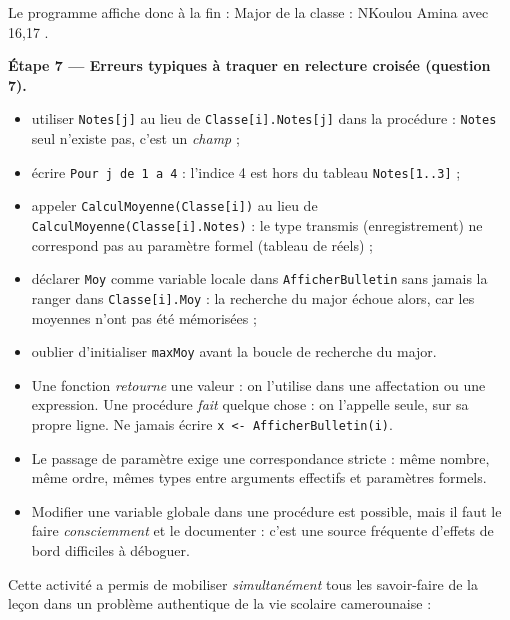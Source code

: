\documentclass[11pt]{article}
\newcounter{popsec}
\newcounter{popsub}
\newcommand{\courssub}[1]{%
  \stepcounter{popsub}%
  \par\vspace{9pt}\noindent{\popxbold\fontsize{11.5}{13}\selectfont\color{popink}{\color{poporange}\thepopsec.\thepopsub}\hspace{6pt}#1}\par\nopagebreak\vspace{4pt}
}
\begin{document}
\begin{exoresolu}
Le programme affiche donc à la fin : \og Major de la classe : NKoulou Amina avec 16,17 \fg{}.

\textbf{Étape 7 — Erreurs typiques à traquer en relecture croisée (question 7).}

\begin{itemize}
  \item utiliser \texttt{Notes[j]} au lieu de \texttt{Classe[i].Notes[j]} dans la procédure : \texttt{Notes} seul n'existe pas, c'est un \emph{champ} ;
  \item écrire \texttt{Pour j de 1 a 4} : l'indice 4 est hors du tableau \texttt{Notes[1..3]} ;
  \item appeler \texttt{CalculMoyenne(Classe[i])} au lieu de \texttt{CalculMoyenne(Classe[i].Notes)} : le type transmis (enregistrement) ne correspond pas au paramètre formel (tableau de réels) ;
  \item déclarer \texttt{Moy} comme variable locale dans \texttt{AfficherBulletin} sans jamais la ranger dans \texttt{Classe[i].Moy} : la recherche du major échoue alors, car les moyennes n'ont pas été mémorisées ;
  \item oublier d'initialiser \texttt{maxMoy} avant la boucle de recherche du major.
\end{itemize}
\end{exoresolu}

\begin{attention}
\begin{itemize}
  \item Une fonction \emph{retourne} une valeur : on l'utilise dans une affectation ou une expression. Une procédure \emph{fait} quelque chose : on l'appelle seule, sur sa propre ligne. Ne jamais écrire \texttt{x <- AfficherBulletin(i)}.
  \item Le passage de paramètre exige une correspondance stricte : même nombre, même ordre, mêmes types entre arguments effectifs et paramètres formels.
  \item Modifier une variable globale dans une procédure est possible, mais il faut le faire \emph{consciemment} et le documenter : c'est une source fréquente d'effets de bord difficiles à déboguer.
\end{itemize}
\end{attention}

\courssub{Bilan de l'activité}

Cette activité a permis de mobiliser \emph{simultanément} tous les savoir-faire de la leçon dans un problème authentique de la vie scolaire camerounaise :
\end{document}
